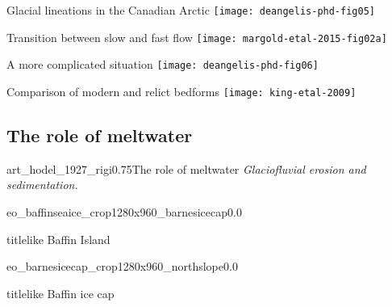     \begin{frame}{Glacial lineations in the Canadian Arctic}
      \texttt{[image: deangelis-phd-fig05]}
    \end{frame}

    \begin{frame}{Transition between slow and fast flow}
      \texttt{[image: margold-etal-2015-fig02a]}
    \end{frame}

    \begin{frame}{A more complicated situation}
      \texttt{[image: deangelis-phd-fig06]}
      \footlineextra{}
    \end{frame}

    \begin{frame}{Comparison of modern and relict bedforms}
      \texttt{[image: king-etal-2009]}
    \end{frame}


\subsection{The role of meltwater}

    \begin{sectionframe}{art_hodel_1927_rigi}{0.75}{The role of meltwater}
      \emph{Glaciofluvial erosion and sedimentation.}
    \end{sectionframe}

    \begin{backgroundframe}[b]{eo_baffinseaice_crop1280x960_barnesicecap}{0.0}{}
      \begin{beamercolorbox}[sep=1em,wd=45mm]{titlelike}
        Baffin Island
      \end{beamercolorbox}
    \end{backgroundframe}

    \begin{backgroundframe}[b]{eo_barnesicecap_crop1280x960_northslope}{0.0}{}
      \begin{beamercolorbox}[sep=1em,wd=45mm]{titlelike}
        Baffin ice cap
      \end{beamercolorbox}
    \end{backgroundframe}

